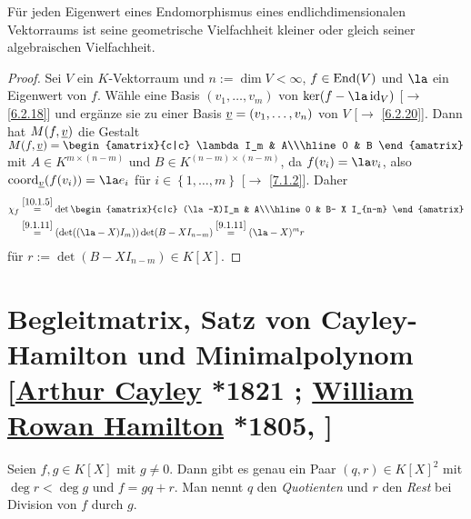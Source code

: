 \documentclass[../../main.tex]{subfiles}
\begin{document}
\begin{sat}\label{10.1.15}
Für jeden Eigenwert eines Endomorphismus eines endlichdimensionalen Vektorraums ist seine geometrische Vielfachheit kleiner oder gleich seiner algebraischen Vielfachheit.
\end{sat}
\begin{proof}
Sei $V$ ein $K$-Vektorraum und $n := \dim V < \infty$, $f\in \operatorname{End}(V)$ und $\la$ ein Eigenwert von $f$. Wähle eine Basis $(v_1,\ldots,v_m)$ von $\ker(f-\la\id_V)$ [$\to$ \ref{6.2.18}] und ergänze sie zu einer Basis ${\underline v} = (v_1,\ldots,v_n)$ von $V$ [$\to$ \ref{6.2.20}]. Dann hat $M(f,{\underline v})$ die Gestalt $M(f,\v) = \begin{amatrix}{c|c}
\lambda I_m & A\\\hline
0 & B
\end{amatrix}$ mit $A\in K^{m\times (n-m)}$ und $B \in K^{(n-m)\times (n-m)}$, da $f(v_i) = \la v_i$, also $\co_\v (f(v_i)) = \la e_i$ für $i\in \left\{1,\ldots,m\right\}$ [$\to$ \ref{7.1.2}]. Daher
\begin{align*}
\chi_f & \overset{\ref{10.1.5}}{=}\det\begin{amatrix}{c|c}
(\la-X)I_m & A\\\hline
0 & B- X I_{n-m}
\end{amatrix}\\
& \overset{\ref{9.1.11}}{=} (\det ((\la-X)I_m))\det(B - XI_{n-m})\overset{\ref{9.1.11}}{=} (\la-X)^m r
\end{align*}
für $r:=\det(B- XI_{n-m})\in K[X]$.
\end{proof}

\section[Begleitmatrix, Satz von Cayley-Hamilton und Minimalpolynom]{Begleitmatrix, Satz von Cayley-Hamilton und Minimalpolynom\\{\small[\href{http://de.wikipedia.org/wiki/Arthur_Cayley}{Arthur Cayley} *1821 ; \href{http://de.wikipedia.org/wiki/William_Rowan_Hamilton}{William Rowan Hamilton} *1805, ]}}

\begin{prospr}\label{10.2.1}
Seien $f,g\in K[X]$ mit $g\ne0$. Dann gibt es genau ein Paar $(q,r)\in K[X]^2$ mit $\deg r<\deg g$ und $f=gq+r$. Man nennt $q$ den \emph{Quotienten} und $r$ den \emph{Rest} bei Division von $f$ durch $g$.
\end{prospr}
\end{document}
